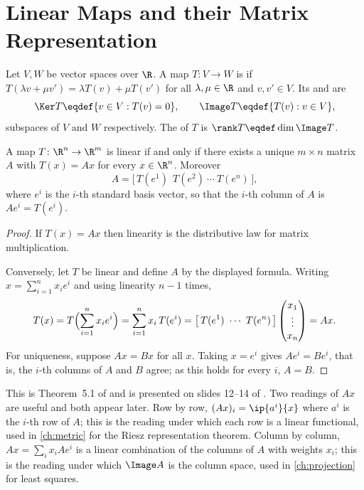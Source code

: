 \section{Linear Maps and their Matrix Representation}\label{sec:lin-maps}

\begin{definition}\label{def:linear-map}
	Let $V,W$ be vector spaces over $\R$. A map $T\colon V\to W$ is  if
	$T(\lambda v+\mu v')=\lambda T(v)+\mu T(v')$ for all $\lambda,\mu\in\R$ and
	$v,v'\in V$. Its  and  are
	\[
		\Ker T\eqdef\{v\in V : T(v)=0\},\qquad
		\Image T\eqdef\{T(v) : v\in V\},
	\]
	subspaces of $V$ and $W$ respectively. The  of $T$ is
	$\rank T\eqdef\dim\Image T$.
\end{definition}

\begin{theorem}\label{thm:matrix-rep}
	A map $T\colon\R^n\to\R^m$ is linear if and only if there exists a unique
	$m\times n$ matrix $A$ with $T(x)=Ax$ for every $x\in\R^n$. Moreover
	\[
		A=\bigl[\,T(e^1)\ \ T(e^2)\ \cdots\ T(e^n)\,\bigr],
	\]
	where $e^i$ is the $i$-th standard basis vector, so that the $i$-th column of
	$A$ is $Ae^i=T(e^i)$.
\end{theorem}

\begin{proof}
	If $T(x)=Ax$ then linearity is the distributive law for matrix multiplication.

	Conversely, let $T$ be linear and define $A$ by the displayed formula. Writing
	$x=\sum_{i=1}^n x_ie^i$ and using linearity $n-1$ times,
	\[
		T(x)=T\Bigl(\sum_{i=1}^n x_ie^i\Bigr)=\sum_{i=1}^n x_i\,T(e^i)
		=\bigl[\,T(e^1)\ \cdots\ T(e^n)\,\bigr]\begin{pmatrix}x_1\\\vdots\\x_n\end{pmatrix}
		=Ax .
	\]
	For uniqueness, suppose $Ax=Bx$ for all $x$. Taking $x=e^i$ gives
	$Ae^i=Be^i$, that is, the $i$-th columns of $A$ and $B$ agree; as this holds for
	every $i$, $A=B$.
\end{proof}

This is Theorem~5.1 of \textcite{fukuda2026notes} and is presented on slides
12--14 of \autocite{fukuda2026analysis}. Two readings of $Ax$ are useful and
both appear later. Row by row, $(Ax)_i=\ip{a^i}{x}$ where $a^i$ is the $i$-th row
of $A$; this is the reading under which each row is a linear functional, used in
\autoref{ch:metric} for the Riesz representation theorem. Column by column,
$Ax=\sum_i x_i A e^i$ is a linear combination of the columns of $A$ with weights
$x_i$; this is the reading under which $\Image A$ is the column space, used in
\autoref{ch:projection} for least squares.

